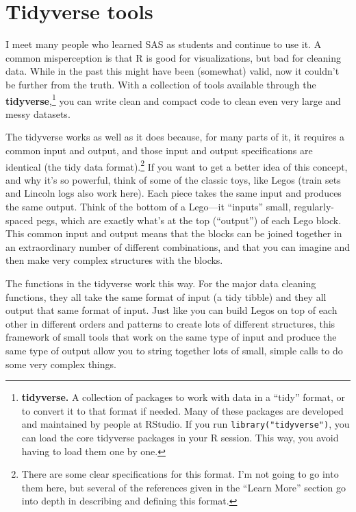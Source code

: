 \documentclass[]{tufte-book}
\begin{document}
\hypertarget{tidyverse-tools}{%
\section{Tidyverse tools}\label{tidyverse-tools}}

 I meet many people who learned SAS as students
and continue
to use it. A common misperception is that R is good for visualizations, but bad for
cleaning data. While in the past this might have been (somewhat) valid, now it couldn't
be further from the truth. With a collection of tools available through the
\textbf{tidyverse},\footnote{\textbf{tidyverse.} A collection of packages to work with data in a
  ``tidy'' format, or to convert it to that format if needed. Many of these packages
  are developed and maintained by people at RStudio. If you run \texttt{library("tidyverse")},
  you can load the core tidyverse packages in your R session. This way, you avoid
  having to load them one by one.}
you can write clean and compact code to clean even very large and
messy datasets.

The tidyverse works as well as it does because, for many parts of it, it requires
a common input and output, and those input and output specifications are
identical (the tidy data format).\footnote{There are some clear specifications for this
  format. I'm not going to go into them here, but several of the references given
  in the ``Learn More'' section go into depth in describing and defining this format.}
If you want to get a better idea of this concept, and why it's so powerful,
think of some of the
classic toys, like Legos (train sets and Lincoln logs also
work here). Each piece takes the same input and produces the same output. Think of
the bottom of a Lego---it ``inputs'' small, regularly-spaced pegs, which are exactly
what's at the top (``output'') of each Lego block. This common input and output
means that the blocks can be joined together in an extraordinary number of
different combinations, and that you can imagine and then make very complex
structures with the blocks.

The functions in the tidyverse work this way. For the major data cleaning functions,
they all take the same format of input (a tidy tibble) and they all output that
same format of input. Just like you can build Legos on top of each other in different
orders and patterns to create lots of different structures, this framework of
small tools that work on the same type of input and produce the same type of output
allow you to string together lots of small, simple calls to do some very complex things.
\end{document}
